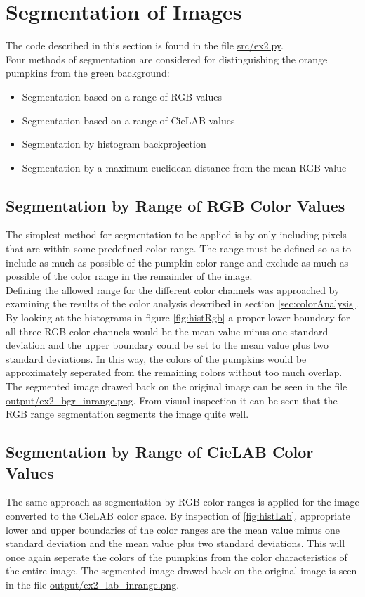 \documentclass[../Head/Main.tex]{subfiles}
\begin{document}
\section{Segmentation of Images} \label{sec:seg}
The code described in this section is found in the file \url{src/ex2.py}.\\
Four methods of segmentation are considered for distinguishing the orange pumpkins from the green background:
\begin{itemize}
\item Segmentation based on a range of RGB values
\item Segmentation based on a range of CieLAB values
\item Segmentation by histogram backprojection
\item Segmentation by a maximum euclidean distance from the mean RGB value
\end{itemize}

\subsection{Segmentation by Range of RGB Color Values}
The simplest method for segmentation to be applied is by only including pixels that are within some predefined color range. The range must be defined so as to include as much as possible of the pumpkin color range and exclude as much as possible of the color range in the remainder of the image.\\
Defining the allowed range for the different color channels was approached by examining the results of the color analysis described in section \ref{sec:colorAnalysis}. By looking at the histograms in figure \ref{fig:histRgb} a proper lower boundary for all three RGB color channels would be the mean value minus one standard deviation and the upper boundary could be set to the mean value plus two standard deviations. In this way, the colors of the pumpkins would be approximately seperated from the remaining colors without too much overlap. The segmented image drawed back on the original image can be seen in the file \url{output/ex2_bgr_inrange.png}. From visual inspection it can be seen that the RGB range segmentation segments the image quite well. 

\subsection{Segmentation by Range of CieLAB Color Values}
The same approach as segmentation by RGB color ranges is applied for the image converted to the CieLAB color space. By inspection of \ref{fig:histLab}, appropriate lower and upper boundaries of the color ranges are the mean value minus one standard deviation and the mean value plus two standard deviations. This will once again seperate the colors of the pumpkins from the color characteristics of the entire image. The segmented image drawed back on the original image is seen in the file \url{output/ex2_lab_inrange.png}.
\end{document}
